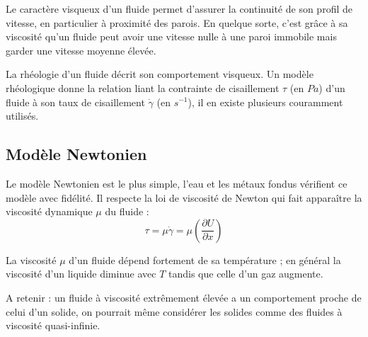 Le caractère visqueux d'un fluide permet d'assurer la continuité de son profil de vitesse, en particulier à proximité des parois. En quelque sorte, c'est grâce à sa viscosité qu'un fluide peut avoir une vitesse nulle à une paroi immobile mais garder une vitesse moyenne élevée.

La rhéologie d'un fluide décrit son comportement visqueux. Un modèle rhéologique donne la relation liant la contrainte de cisaillement $\tau$ (en $Pa$) d'un fluide à son taux de cisaillement $\dot{\gamma}$ (en $s^{-1}$), il en existe plusieurs couramment utilisés.


\subsection{Modèle Newtonien}

Le modèle Newtonien est le plus simple, l'eau et les métaux fondus vérifient ce modèle avec fidélité. Il respecte la loi de viscosité de Newton qui fait apparaître la viscosité dynamique $\mu$ du fluide :
%
\begin{equation}
\tau = \mu \dot{\gamma} = \mu \left( \frac{\partial U}{\partial x} \right)
\end{equation}

La viscosité $\mu$ d'un fluide dépend fortement de sa température ; en général la viscosité d'un liquide diminue avec $T$ tandis que celle d'un gaz augmente.

A retenir : un fluide à viscosité extrêmement élevée a un comportement proche de celui d'un solide, on pourrait même considérer les solides comme des fluides à viscosité quasi-infinie.

